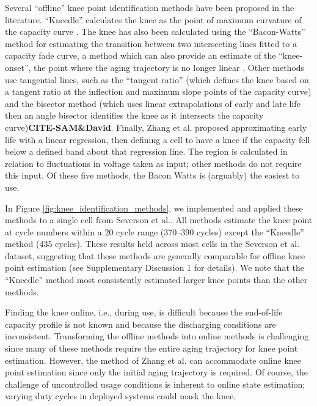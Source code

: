 \documentclass[journal=jpcl, manuscript=article, layout=onecolumn]{achemso}
\begin{document}
Several ``offline'' knee point identification methods have been proposed in the literature.
``Kneedle'' calculates the knee as the point of maximum curvature of the capacity curve \cite{satopaa_finding_2011}. The knee has also been calculated using the ``Bacon-Watts'' method for estimating the transition between two intersecting lines fitted to a capacity fade curve, a method which can also provide an estimate of the ``knee-onset'', the point where the aging trajectory is no longer linear \cite{fermin-cueto_identification_2020}. Other methods use tangential lines, such as the ``tangent-ratio'' (which defines the knee based on a tangent ratio at the inflection and maximum slope points of the capacity curve)\cite{diao_algorithm_2019} and the bisector method (which uses linear extrapolations of early and late life then an angle bisector identifies the knee as it intersects the capacity curve)\textbf{CITE-SAM\&David}. Finally, Zhang et al.\cite{zhang_accelerated_2019} proposed approximating early life with a linear regression, then defining a cell to have a knee if the capacity fell below a defined band about that regression line. The region is calculated in relation to fluctuations in voltage taken as input; other methods do not require this input. Of these five methods, the Bacon Watts is (arguably) the easiest to use.

In Figure \ref{fig:knee_identification_methods}, we implemented and applied these methods to a single cell from Severson et al.\cite{severson_data-driven_2019}. All methods estimate the knee point at cycle numbers within a 20 cycle range (370--390 cycles) except the ``Kneedle'' method (435 cycles). These results held across most cells in the Severson et al.\cite{severson_data-driven_2019} dataset, suggesting that these methods are generally comparable for offline knee point estimation (see Supplementary Discussion 1 for details). We note that the ``Kneedle'' method most consistently estimated larger knee points than the other methods.

Finding the knee online, i.e., during use, is difficult because the end-of-life capacity profile is not known and because the discharging conditions are inconsistent. Transforming the offline methods into online methods is challenging since many of these methods require the entire aging trajectory for knee point estimation. However, the method of Zhang et al.\cite{zhang_accelerated_2019} can accommodate online knee point estimation since only the initial aging trajectory is required. Of course, the challenge of uncontrolled usage conditions is inherent to online state estimation; varying duty cycles in deployed systems could mask the knee.
\end{document}
